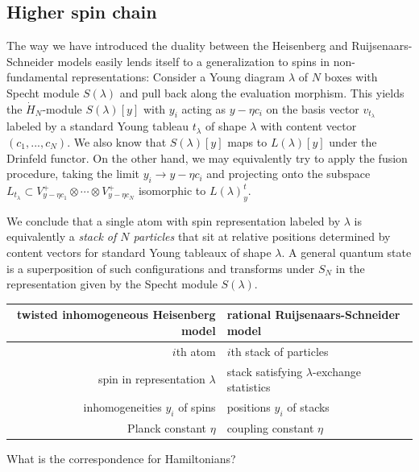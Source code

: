 \documentclass[11pt]{report}
\theoremstyle{definition}
\theoremstyle{remark}
\theoremstyle{remark}
\begin{document}
\subsection{Higher spin chain}

The way we have introduced the duality between the Heisenberg and Ruijsenaars-Schneider models easily lends itself to a generalization to spins in non-fundamental representations: Consider a Young diagram $\lambda$ of $N$ boxes with Specht module $S(\lambda)$ and pull back along the evaluation morphism. This yields the $\dot H_N$-module $S(\lambda)[y]$ with $y_i$ acting as $y - \eta c_i$ on the basis vector $v_{t_\lambda}$ labeled by a standard Young tableau $t_\lambda$ of shape $\lambda$ with content vector $(c_1,...,c_N)$. We also know that $S(\lambda)[y]$ maps to $L(\lambda)[y]$ under the Drinfeld functor. On the other hand, we may equivalently try to apply the fusion procedure, taking the limit $y_i \to y - \eta c_i$ and projecting onto the subspace $L_{t_\lambda} \subset V_{y-\eta c_1}^+ \otimes \cdots \otimes V_{y-\eta c_N}^+$ isomorphic to $L(\lambda)_y^t$.

We conclude that a single atom with spin representation labeled by $\lambda$ is equivalently a \emph{stack of $N$ particles} that sit at relative positions determined by content vectors for standard Young tableaux of shape $\lambda$. A general quantum state is a superposition of such configurations and transforms under $S_N$ in the representation given by the Specht module $S(\lambda)$.

\begin{center}
\begin{tabular}{|r||l|}
\hline
twisted inhomogeneous Heisenberg model & rational Ruijsenaars-Schneider model \\
\hline
$i$th atom & $i$th stack of particles \\
spin in representation $\lambda$ & stack satisfying $\lambda$-exchange statistics \\
inhomogeneities $y_i$ of spins & positions $y_i$ of stacks \\
Planck constant $\eta$ & coupling constant $\eta$ \\
\hline
\end{tabular}
\end{center}

What is the correspondence for Hamiltonians?
\end{document}
